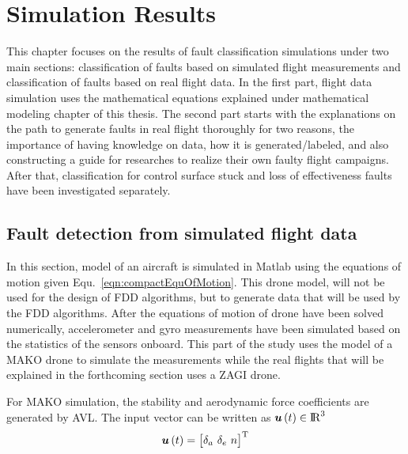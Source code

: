\chapter{Simulation Results}

This chapter focuses on the results of fault classification simulations under two main sections: classification of faults based on simulated flight measurements and classification of faults based on real flight data. 
In the first part, flight data simulation uses the mathematical equations explained under mathematical modeling chapter of this thesis. 
The second part starts with the explanations on the path to generate faults in real flight thoroughly for two reasons, the importance of having knowledge on data, how it is generated/labeled, and also constructing a guide for researches to realize their own faulty flight campaigns. 
After that, classification for control surface stuck and loss of effectiveness faults have been investigated separately. 

\section{Fault detection from simulated flight data}

In this section, model of an aircraft is simulated in Matlab using the equations of motion given Equ.~\ref{eqn:compactEquOfMotion}. 
This drone model, will not be used for the design of FDD algorithms, but to generate data that will be used by the FDD algorithms. 
After the equations of motion of drone have been solved numerically, accelerometer and gyro measurements have been simulated based on the statistics of the sensors onboard. 
This part of the study uses the model of a MAKO drone to simulate the measurements while the real flights that will be explained in the forthcoming section uses a ZAGI drone.

For MAKO simulation, the stability and aerodynamic force coefficients are generated by AVL. The input vector can be written as $\bm{u}\left(t\right) \in {\rm I\!R} ^3 $
\begin{equation}
\bm{u}\left(t\right)= \begin{bmatrix} {\delta}_{a}\ {\delta}_{e}\ n \end{bmatrix}^{\rm T}
\end{equation}

